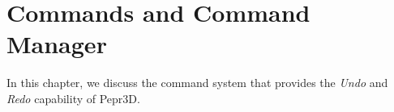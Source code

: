 \chapter{Commands and Command Manager}

In this chapter, we discuss the command system that provides the \textit{Undo} and \textit{Redo} capability of Pepr3D.